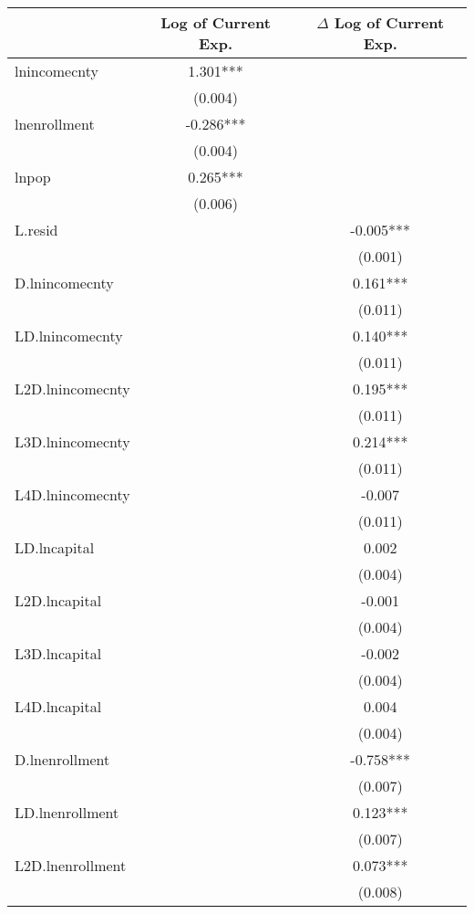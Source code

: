\begin{tabular}{lcc}
\hline
 & Log of Current Exp. & $\Delta$ Log of Current Exp. \\ 
\hline
lnincomecnty        & 1.301*** &  \\
                    & (0.004)  &  \\
lnenrollment        & -0.286*** &  \\
                    & (0.004)  &  \\
lnpop               & 0.265*** &  \\
                    & (0.006)  &  \\
L.resid             &  & -0.005*** \\
                    &  & (0.001) \\
D.lnincomecnty      &  & 0.161*** \\
                    &  & (0.011) \\
LD.lnincomecnty     &  & 0.140*** \\
                    &  & (0.011) \\
L2D.lnincomecnty    &  & 0.195*** \\
                    &  & (0.011) \\
L3D.lnincomecnty    &  & 0.214*** \\
                    &  & (0.011) \\
L4D.lnincomecnty    &  & -0.007 \\
                    &  & (0.011) \\
LD.lncapital        &  & 0.002 \\
                    &  & (0.004) \\
L2D.lncapital       &  & -0.001 \\
                    &  & (0.004) \\
L3D.lncapital       &  & -0.002 \\
                    &  & (0.004) \\
L4D.lncapital       &  & 0.004 \\
                    &  & (0.004) \\
D.lnenrollment      &  & -0.758*** \\
                    &  & (0.007) \\
LD.lnenrollment     &  & 0.123*** \\
                    &  & (0.007) \\
L2D.lnenrollment    &  & 0.073*** \\
                    &  & (0.008) \\

\end{tabular}
